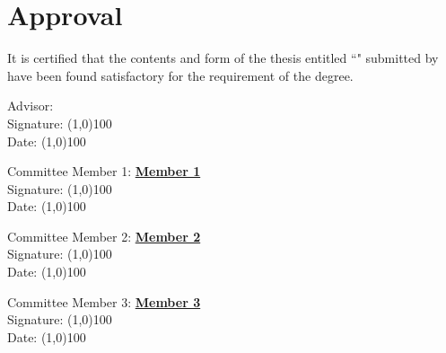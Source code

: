 \chapter*{Approval}
It is certified that the contents and form of the thesis entitled ``\textbf{\@title}" submitted by \textbf{\@author} have been found satisfactory for the requirement of the degree.

\vspace*{10pt}\noindent
Advisor: \textbf{\underline{\@adviser}}\vspace*{10pt}\noindent\\
Signature: \line(1,0){100}\vspace*{10pt}\noindent\\
\vspace*{10pt}\noindent
Date:  \line(1,0){100}


\begin{flushright}
Committee Member 1: \textbf{\underline{Member 1}}\\
\vspace*{10pt}\noindent
Signature: \line(1,0){100}\\
\vspace*{10pt}\noindent
Date:  \line(1,0){100}


Committee Member 2: \textbf{\underline{Member 2}}\\
\vspace*{10pt}\noindent
Signature: \line(1,0){100}\\
\vspace*{10pt}\noindent
Date:  \line(1,0){100}


Committee Member 3: \textbf{\underline{Member 3}}\\
\vspace*{10pt}\noindent
Signature: \line(1,0){100}\\
\vspace*{10pt}\noindent
Date:  \line(1,0){100}
\end{flushright}
